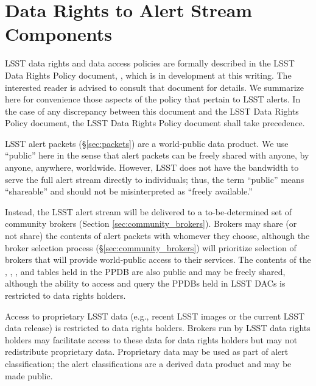 \section{Data Rights to Alert Stream Components}\label{sec:data_rights}

LSST data rights and data access policies are formally described in the LSST Data Rights Policy document, , which is in development at this writing.
The interested reader is advised to consult that document for details.
We summarize here for convenience those aspects of the policy that pertain to LSST alerts.
In the case of any discrepancy between this document and the LSST Data Rights Policy document, the LSST Data Rights Policy document shall take precedence.

LSST alert packets (\S \ref{sec:packets}) are a world-public data product.
We use ``public'' here in the sense that alert packets can be freely shared with anyone, by anyone, anywhere, worldwide.
However, LSST does not have the bandwidth to serve the full alert stream directly to individuals; thus, the term ``public'' means ``shareable'' and should not be misinterpreted as ``freely available.''

Instead, the LSST alert stream will be delivered to a to-be-determined set of community brokers (Section \ref{sec:community_brokers}).
Brokers may share (or not share) the contents of alert packets with whomever they choose, although the broker selection process (\S \ref{sec:community_brokers}) will prioritize selection of brokers that will provide world-public access to their services.
The contents of the \DIAObject, \DIASource, \DIAForcedSource, and \SSObject tables held in the PPDB are also public and may be freely shared, although the ability to access and query the PPDBs held in LSST DACs is restricted to data rights holders.

Access to proprietary LSST data (e.g., recent LSST images or the current LSST data release) is restricted to data rights holders.
Brokers run by LSST data rights holders may facilitate access to these data for data rights holders but may not redistribute proprietary data.
Proprietary data may be used as part of alert classification; the alert classifications are a derived data product and may be made public.
